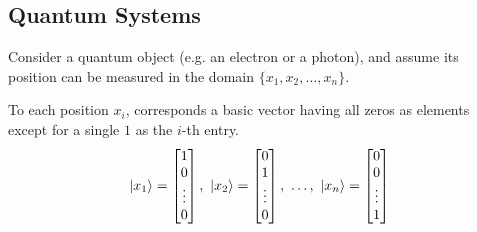\documentclass[12pt,a4paper]{report}
\theoremstyle{definition}
\theoremstyle{definition}
\theoremstyle{definition}
\begin{document}
\subsection{Quantum Systems}
Consider a quantum object (e.g. an electron or a photon), and assume its position can be measured in the domain $\{x_1, x_2, \ldots, x_n\}$.
\begin{center}
\end{center}
To each position $x_i$, corresponds a basic vector having all zeros as elements except for a single $1$ as the $i$-th entry.
\begin{equation*}
    \ket{x_1} = \begin{bmatrix}
        1\\
        0\\
        \vdots\\
        0\\
    \end{bmatrix},\ 
    \ket{x_2} = \begin{bmatrix}
        0\\
        1\\
        \vdots\\
        0\\
    \end{bmatrix},\ \ldots,\ 
    \ket{x_n} = \begin{bmatrix}
        0\\
        0\\
        \vdots\\
        1\\
    \end{bmatrix}
\end{equation*}
\end{document}
